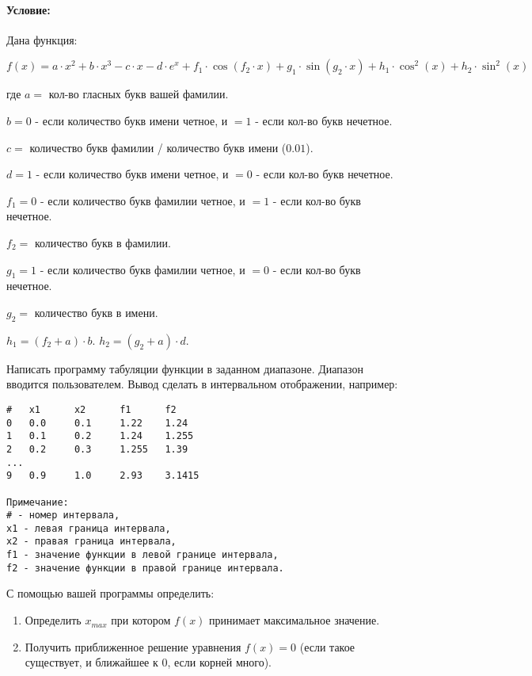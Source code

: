 \paragraph{Условие:} \hspace{0pt}



Дана функция:

$$
f(x) = a \cdot x^2
+ b \cdot x^3
- c \cdot x
- d \cdot e^x
+ f_1 \cdot \cos{(f_2 \cdot x)}
+ g_1 \cdot \sin{(g_2 \cdot x)}
+ h_1 \cdot \cos^2{(x)}
+ h_2 \cdot \sin^2{(x)}
$$

где $a = $ кол-во гласных букв вашей фамилии.

$b = 0$ - если количество букв имени четное, и $ = 1$ - если кол-во букв нечетное.

$c = $ количество букв фамилии / количество букв имени ($ 0.01 $).

$d = 1$ - если количество букв имени четное, и $ = 0$ - если кол-во букв нечетное.

$f_1 = 0$ - если количество букв фамилии четное, и $ = 1$ - если кол-во букв нечетное.

$f_2 = $ количество букв в фамилии.

$g_1 = 1$ - если количество букв фамилии четное, и $ = 0$ - если кол-во букв нечетное.

$g_2 = $ количество букв в имени.

$h_1 = (f_2 + a) \cdot b$. $h_2 = (g_2 + a) \cdot d$.

Написать программу табуляции функции в заданном диапазоне. Диапазон вводится пользователем. Вывод сделать в интервальном отображении, например:

\begin{lstlisting}[language=empty,]
#   x1      x2      f1      f2
0   0.0     0.1     1.22    1.24
1   0.1     0.2     1.24    1.255
2   0.2     0.3     1.255   1.39
...
9   0.9     1.0     2.93    3.1415

Примечание:
# - номер интервала,
x1 - левая граница интервала,
х2 - правая граница интервала,
f1 - значение функции в левой границе интервала,
f2 - значение функции в правой границе интервала.
\end{lstlisting}

С помощью вашей программы определить:\
\begin{enumerate}
    \item Определить $x_{max}$ при котором $f(x)$ принимает максимальное значение.
    \item Получить приближенное решение уравнения $f(x) = 0$ (если такое существует, и ближайшее к $0$, если корней много).
\end{enumerate}



